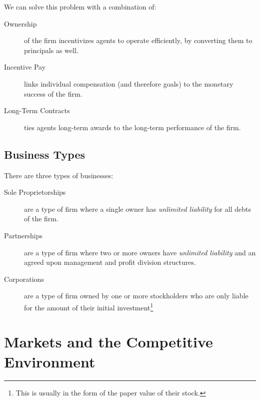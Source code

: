                     We can solve this problem with a combination of:
                    \begin{description}
                        \item[Ownership] of the firm incentivizes agents to operate efficiently, by converting them to principals as well.
                        \item[Incentive Pay] links individual compensation (and therefore goals) to the monetary success of the firm.
                        \item[Long-Term Contracts] ties agents long-term awards to the long-term performance of the firm.
                    \end{description}
                \subsection{Business Types} %
                \label{sub:business_types}
                    There are three types of businesses:
                    \begin{description}
                        \item[Sole Proprietorships]are a type of firm where a single owner has \textit{unlimited liability} for all debts of the firm.
                        \item[Partnerships] are a type of firm where two or more owners have \textit{unlimited liability} and an agreed upon management and profit division structures.
                        \item[Corporations] are a type of firm owned by one or more stockholders who are only liable for the amount of their initial investment\footnote{This is usually in the form of the paper value of their stock.}
                    \end{description}
            \section{Markets and the Competitive Environment} %
            \label{sec:markets_and_the_competitive_environment}
